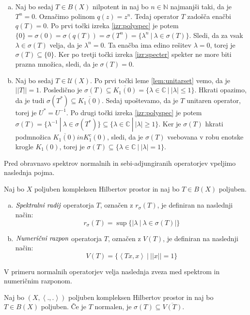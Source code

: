 \documentclass[mat2]{matdelo}
\newcommand{\N}{\mathbb{N}}
\newcommand{\C}{\mathbb{C}}
\newcommand{\abs}[1]{\ensuremath{\lvert #1 \rvert}}
\newcommand{\norm}[1]{\abs{\abs{#1}}}
\newcommand{\pojem}[1]{\ensuremath{\emph{#1}}}
\newcommand{\Sp}[2]{\ensuremath{\left<#1, #2\right>}}
\begin{document}
\begin{dokaz}
\begin{enumerate}[a)]
				\item Naj bo sedaj $T\in B(X)$ nilpotent in naj bo $n\in\N$ najmanjši taki, da je $T^n = 0$. Označimo polinom $q(z)=z^n$. Tedaj operator $T$ zadošča enačbi $q(T) = 0$. Po prvi točki izreka \ref{izr:polyspec} je potem $\{0\}=\sigma(0)=\sigma(q(T))=\sigma(T^n)=\{\lambda^n~|~\lambda\in\sigma(T)\}$. Sledi, da za vsak $\lambda\in\sigma(T)$ velja, da je $\lambda^n = 0$. Ta enačba ima edino rešitev $\lambda=0$, torej je $\sigma(T)\subseteq\{0\}$. Ker po tretji točki izreka \ref{izr:specter} spekter ne more biti prazna množica, sledi, da je $\sigma(T)=0$.
				\item Naj bo sedaj $T\in \mathcal{U}(X)$. Po prvi točki leme \ref{lem:unitarset} vemo, da je $\norm{T}=1$. Posledično je $\sigma(T)\subseteq \overline{K_1(0)} = \{\lambda\in\C~|~\abs{\lambda}\leq 1\}$. Hkrati opazimo, da je tudi $\sigma(T^*) \subseteq \overline{K_1(0)}$. Sedaj upoštevamo, da je $T$ unitaren operator, torej je $U^* = U^{-1}$. Po drugi točki izreka \ref{izr:polyspec} je potem $\sigma(T) =
				\{\lambda^{-1}~|~\lambda\in\sigma(T^*)\}\subseteq \{\lambda\in\C~|~\abs{\lambda}\geq 1\}$. Ker je $\sigma(T)$ hkrati podmnožica $\overline{K_1(0)} in K_1^c(0)$, sledi, da je $\sigma(T)$ vsebovana v robu enotske krogle $K_1(0)$, torej je $\sigma(T)\subseteq\{\lambda\in\C~|~\abs{\lambda}=1\}$.
			\end{enumerate}
		\end{dokaz}
		
		Pred obravnavo spektrov normalnih in sebi-adjungiranih operatorjev vpeljimo naslednja pojma.
		
		\begin{definicija}
			\label{def:specrad}
			Naj bo $X$ poljuben kompleksen Hilbertov prostor in naj bo $T\in B(X)$ poljuben. \begin{enumerate}[a)]
				\item \pojem{Spektralni radij} operatorja $T$, označen z $r_\sigma(T)$, je definiran na naslednji način: $$r_\sigma(T) = \sup\{\abs{\lambda~|~\lambda\in\sigma(T)}\}$$
				\item \pojem{Numerični razpon} operatorja $T$, označen z $V(T)$, je definiran na naslednji način: $$V(T)=\{\Sp{Tx}{x}~|~\norm{x}=1\}$$
			\end{enumerate}
		\end{definicija}
		
		V primeru normalnih operatorjev velja naslednja zveza med spektrom in numeričnim razponom.
		
		\begin{lema}
			\label{lem:normalnumrazspec}
			Naj bo $(X, \Sp{.}{.})$ poljuben kompleksen Hilbertov prostor in naj bo $T\in B(X)$ poljuben. Če je $T$ normalen, je $\sigma(T)\subseteq \overline{V(T)}$.
		\end{lema}
		
\end{document}
